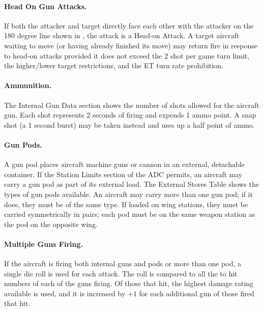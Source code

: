 \paragraph{Head On Gun Attacks.} If both the attacker and target directly face each other with the attacker on the 180 degree line shown in , the attack is a Head-on Attack. A target aircraft waiting to move (or having already finished its move) may return fire in response to head-on attacks provided it does not exceed the 2 shot per game turn limit, the higher/lower target restrictions, and the ET turn rate prohibition. 

\paragraph{Ammunition.} The Internal Gun Data section shows the number of shots allowed for the aircraft gun. Each shot represents 2 seconds of firing and expends 1 ammo point. A snap shot (a 1 second burst) may be taken instead and uses up a half point of ammo.

\paragraph{Gun Pods.} A gun pod places aircraft machine guns or cannon in an external, detachable container. If the Station Limits section of the ADC permits, an aircraft may carry a gun pod as part of its external load. The External Stores Table shows the types of gun pods available. An aircraft may carry more than one gun pod; if it does, they must be of the same type. If loaded on wing stations, they must be carried symmetrically in pairs; each pod must be on the same weapon station as the pod on the opposite wing.

\paragraph{Multiple Guns Firing.} If the aircraft is firing both internal guns and pods or more than one pod, a single die roll is used for each attack. The roll is compared to all the to hit numbers of each of the guns firing. Of those that hit, the highest damage rating available is used, and it is increased by $+1$ for each additional gun of those fired that hit.

